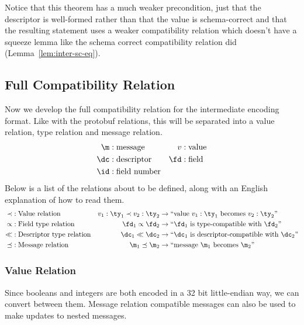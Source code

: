 Notice that this theorem has a much weaker precondition, just that the
descriptor is well-formed rather than that the value is schema-correct and that
the resulting statement uses a weaker compatibility relation which doesn't have
a squeeze lemma like the schema correct compatibility relation did
(Lemma~\ref{lem:inter-sc-eq}).

\subsection{Full Compatibility Relation}\label{sec:ip-compat-rel}

Now we develop the full compatibility relation for the intermediate encoding
format. Like with the protobuf relations, this will be separated into a value
relation, type relation and message relation.
\begin{align*}
  \m &: \text{message} & v &: \text{value} \\
  \dc &: \text{descriptor} & \fd &: \text{field} \\
  \id &: \text{field number}
\end{align*}
Below is a list of the relations about to be defined, along with an English
explanation of how to read them.
\begin{align*}
  \valrel &: \text{Value relation} & v_1 : \ty_1 \valrel v_2 : \ty_2 &\rightarrow ``\text{value } v_1 : \ty_1 \text{ becomes } v_2 :
                                           \ty_2 " \\
  \fieldrel &: \text{Field type relation} & \fd_1 \fieldrel \fd_2 &\rightarrow ``\fd_1 \text{ is type-compatible with }
                                          \fd_2" \\
  \dcompat &: \text{Descriptor type relation} & \dc_1 \dcompat \dc_2 &\rightarrow ``\dc_1 \text{ is
                                                     descriptor-compatible with } \dc_2" \\
  \msgrel &: \text{Message relation} & \m_1 \msgrel \m_2 &\rightarrow ``\text{message } \m_1 \text{ becomes } \m_2"
\end{align*}

\subsubsection{Value Relation}\label{sec:ip-val-rel}
Since booleans and integers are both encoded in a 32 bit little-endian way, we
can convert between them. Message relation compatible messages can also be used
to make updates to nested messages.

